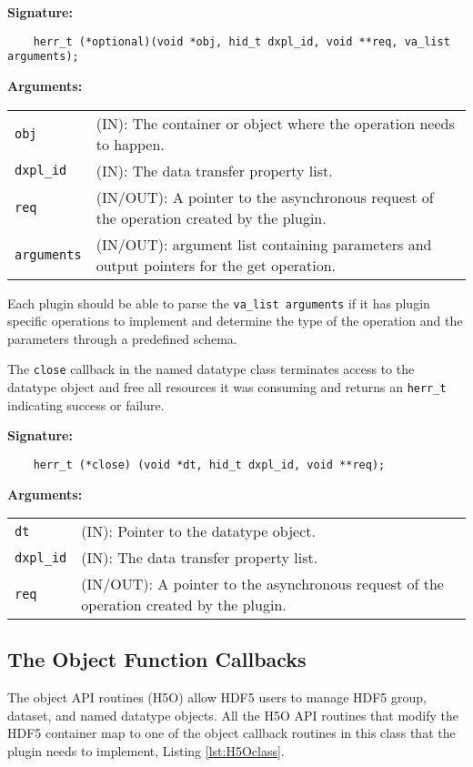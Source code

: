 \begin{mdframed}[style=bgbox]
\textbf{Signature:}
\begin{lstlisting}
    herr_t (*optional)(void *obj, hid_t dxpl_id, void **req, va_list arguments);
\end{lstlisting}

\textbf{Arguments:}\\
\begin{tabular}{l p{13.5cm}}
  \texttt{obj} & (IN): The container or object where the operation needs to happen.\\
  \texttt{dxpl\_id} & (IN): The data transfer property list.\\
  \texttt{req} & (IN/OUT): A pointer to the asynchronous request of the operation created by the plugin.\\
  \texttt{arguments} & (IN/OUT): argument list containing parameters and output pointers for the get operation. \\
\end{tabular}
\end{mdframed}

Each plugin should be able to parse the \texttt{va\_list arguments} if it has plugin specific operations to implement and determine the type of the operation and the parameters through a predefined schema. 

The \texttt{close} callback in the named datatype class terminates
access to the datatype object and free all resources it was
consuming and returns an \texttt{herr\_t} indicating success or failure.\bigskip

\begin{mdframed}[style=bgbox]
\textbf{Signature:}
\begin{lstlisting}
    herr_t (*close) (void *dt, hid_t dxpl_id, void **req);
\end{lstlisting}

\textbf{Arguments:}\\
\begin{tabular}{l p{13.5cm}}
  \texttt{dt} & (IN): Pointer to the datatype object.\\
  \texttt{dxpl\_id} & (IN): The data transfer property list.\\
  \texttt{req} & (IN/OUT): A pointer to the asynchronous request of the
  operation created by the plugin.\\
\end{tabular}
\end{mdframed}

\subsection{The Object Function Callbacks}
The object API routines (H5O) allow HDF5 users to manage HDF5 group,
dataset, and named datatype objects. All the H5O API routines that
modify the HDF5 container map to one of the object callback routines
in this class that the plugin needs to implement, Listing \ref{lst:H5Oclass}.

